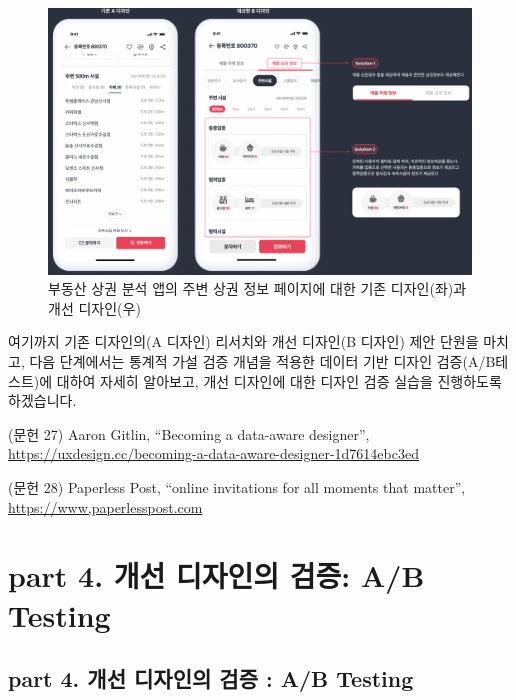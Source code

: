 \documentclass[
  letterpaper,
]{book}
\begin{document}
\begin{figure}[H]

{\centering \includegraphics{img/fig25.png}

}

\caption{부동산 상권 분석 앱의 주변 상권 정보 페이지에 대한 기존
디자인(좌)과 개선 디자인(우)}

\end{figure}%

여기까지 기존 디자인의(A 디자인) 리서치와 개선 디자인(B 디자인) 제안
단원을 마치고, 다음 단계에서는 통계적 가설 검증 개념을 적용한 데이터
기반 디자인 검증(A/B테스트)에 대하여 자세히 알아보고, 개선 디자인에 대한
디자인 검증 실습을 진행하도록 하겠습니다.

(문헌 27) Aaron Gitlin, ``Becoming a data-aware designer'',
\url{https://uxdesign.cc/becoming-a-data-aware-designer-1d7614ebc3ed}

(문헌 28) Paperless Post, ``online invitations for all moments that
matter'', \url{https://www,paperlesspost.com}

\part{\textbf{part 4. 개선 디자인의 검증: A/B Testing}}

\chapter*{part 4. 개선 디자인의 검증 : A/B
Testing}\label{part-4.-uxac1cuxc120-uxb514uxc790uxc778uxc758-uxac80uxc99d-ab-testing-1}

\end{document}
